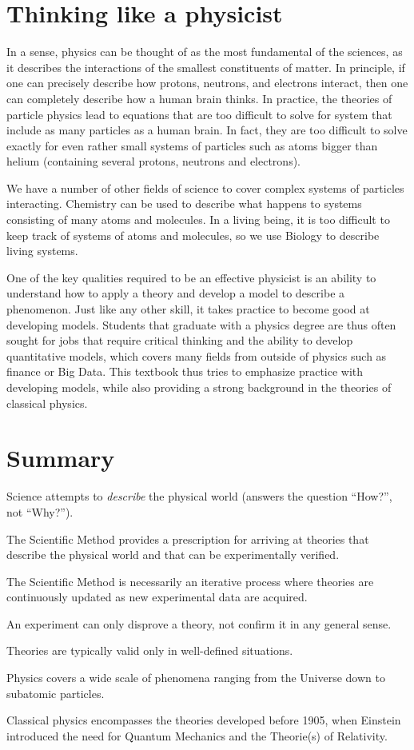 \section{Thinking like a physicist}
In a sense, physics can be thought of as the most fundamental of the sciences, as it describes the interactions of the smallest constituents of matter. In principle, if one can precisely describe how protons, neutrons, and electrons interact, then one can completely describe how a human brain thinks. In practice, the theories of particle physics lead to equations that are too difficult to solve for system that include as many particles as a human brain. In fact, they are too difficult to solve exactly for even rather small systems of particles such as atoms bigger than helium (containing several protons, neutrons and electrons). 

We have a number of other fields of science to cover complex systems of particles interacting. Chemistry can be used to describe what happens to systems consisting of many atoms and molecules. In a living being, it is too difficult to keep track of systems of atoms and molecules, so we use Biology to describe living systems. 

One of the key qualities required to be an effective physicist is an ability to understand how to apply a theory and develop a model to describe a phenomenon. Just like any other skill, it takes practice to become good at developing models. Students that graduate with a physics degree are thus often sought for jobs that require critical thinking and the ability to develop quantitative models, which covers many fields from outside of physics such as finance or Big Data. This textbook thus tries to emphasize practice with developing models, while also providing a strong background in the theories of classical physics. 

\newpage
\section{Summary}
\vspace{2cm}
\begin{chapterSummary}
\item Science attempts to \textit{describe} the physical world (answers the question ``How?'', not ``Why?'').
\item The Scientific Method provides a prescription for arriving at theories that describe the physical world and that can be 
experimentally verified.
\item The Scientific Method is necessarily an iterative process where theories are continuously updated as new experimental data are acquired.
\item An experiment can only disprove a theory, not confirm it in any general sense.
\item Theories are typically valid only in well-defined situations.
\item Physics covers a wide scale of phenomena ranging from the Universe down to subatomic particles.
\item Classical physics encompasses the theories developed before 1905, when Einstein introduced the need for Quantum Mechanics and the Theorie(s) of Relativity.
\end{chapterSummary}